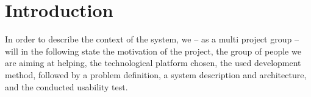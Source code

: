 \chapter{Introduction}
\label{chap:introduction}

In order to describe the context of the system, we -- as a multi project group -- will in the following state the motivation of the project, the group of people we are aiming at helping, the technological platform chosen, the used development method, followed by a problem definition, a system description and architecture, and the conducted usability test.









